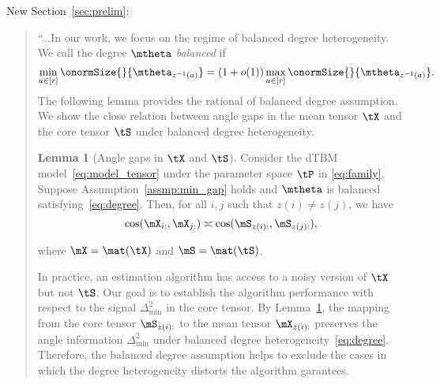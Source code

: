 \documentclass[11pt]{article}
\theoremstyle{definition}
\newtheorem{lem}{Lemma}
\theoremstyle{definition}
\begin{document}
\begin{enumerate}[wide, labelwidth=!, labelindent=0pt]
\begin{enumerate}
New Section~\ref{sec:prelim}:
    \begin{quote}
    ``...In our work, we focus on the regime of balanced degree heterogeneity. We call the degree $\mtheta$ \emph{balanced} if
\begin{equation}\label{eq:degree}
{\min_{a\in[r]} \onormSize{}{\mtheta_{z^{-1}(a)}}=\left(1+o(1)\right)\max_{a\in[r]}\onormSize{}{\mtheta_{z^{-1}(a)}}}.
\end{equation}
The following lemma provides the rational of balanced degree assumption. We show the close relation between angle gaps in the mean tensor $\tX$ and the core tensor $\tS$ under balanced degree heterogeneity. 


\begin{lem}[Angle gaps in $\tX$ and $\tS$]\label{lem:angle_gap_x} Consider the dTBM model~\eqref{eq:model_tensor} under the parameter space $\tP$ in \eqref{eq:family}. Suppose Assumption~\ref{assmp:min_gap} holds and $\mtheta$ is balanced satisfying~\eqref{eq:degree}. Then, for all $i,j$ such that $z(i) \neq z(j)$, we have
\begin{equation}
 \cos(\mX_{i:}, \mX_{j:})\asymp  \cos(\mS_{z(i):}, \mS_{z(j):}),
\end{equation}

where $\mX =\mat(\tX)$ and $\mS = \mat (\tS)$.
\end{lem}



In practice, an estimation algorithm has access to a noisy version of $\tX$ but not $\tS$. Our goal is to establish the algorithm performance with respect to the signal $\Delta^2_{\min}$ in the core tensor. By Lemma~\ref{lem:angle_gap_x}, the mapping from the core tensor $\mS_{z(i):}$ to the mean tensor $\mX_{z(i):}$ preserves the angle information $\Delta_{\min}^2$ under balanced degree heterogeneity~\eqref{eq:degree}. Therefore, the balanced degree assumption helps to exclude the cases in which the degree heterogeneity distorts the algorithm garantees. 


\end{quote}
\end{enumerate}
\end{enumerate}
\end{document}
